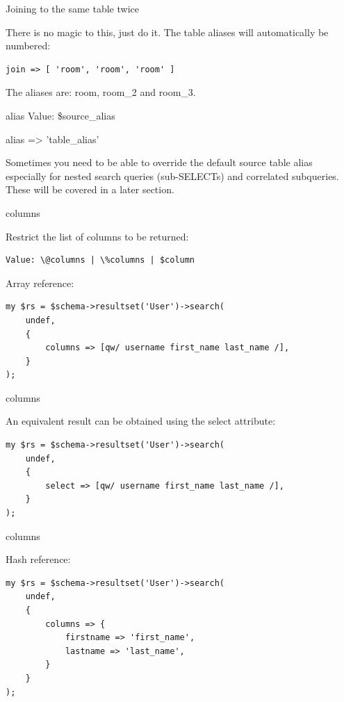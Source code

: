 \begin{frame}[fragile]{Joining to the same table twice}

There is no magic to this, just do it. The table aliases will automatically
be numbered:

\begin{lstlisting}
join => [ 'room', 'room', 'room' ]
\end{lstlisting}

The aliases are: room, room\_2 and room\_3.
\end{frame}

\begin{frame}[fragile]{alias}
Value: \$source\_alias

    alias => 'table\_alias'

\end{frame}

Sometimes you need to be able to override the default source table alias especially for nested search queries (sub-SELECTs) and correlated subqueries. These will be covered in a later section.

\begin{frame}[fragile]{columns}

Restrict the list of columns to be returned:

\begin{lstlisting}
Value: \@columns | \%columns | $column
\end{lstlisting}

Array reference:

\begin{lstlisting}
my $rs = $schema->resultset('User')->search(
    undef,
    {
        columns => [qw/ username first_name last_name /],
    }
);
\end{lstlisting}
\end{frame}

\begin{frame}[fragile]{columns}

An equivalent result can be obtained using the select attribute:
\begin{lstlisting}
my $rs = $schema->resultset('User')->search(
    undef,
    {
        select => [qw/ username first_name last_name /],
    }
);
\end{lstlisting}
\end{frame}

\begin{frame}[fragile]{columns}

Hash reference:

\begin{lstlisting}
my $rs = $schema->resultset('User')->search(
    undef,
    {
        columns => {
            firstname => 'first_name',
            lastname => 'last_name',
        }
    }
);
\end{lstlisting}
\end{frame}

